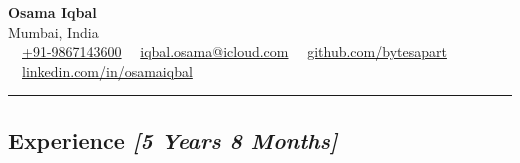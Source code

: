 \documentclass[11pt,a4paper]{article}
\begin{document}
\begin{center}
        {\LARGE \textbf{Osama Iqbal}}\\
        Mumbai, India
        \vspace{0.05cm}
        \\
        \raisebox{-0.2\height} {\Large \faPhoneSquare} \ \ \href{tel:+919867143600}{+91-9867143600} \hfill\raisebox{-0.2\height}{\Large \faEnvelopeSquare} \ \ \href{mailto:iqbal.osama@icloud.com}{iqbal.osama@icloud.com} \hfill \raisebox{-0.2\height}{\Large \faGithubSquare} \ \ \href{https://github.com/bytesapart}{github.com/bytesapart} \hfill \raisebox{-0.2\height}{\Large \faLinkedinSquare} \ \ \href{https://linkedin.com/in/osamaiqbal}{linkedin.com/in/osamaiqbal}
\end{center}


\hrule
\vspace{-1em}
\subsection*{\Large Experience \emph{[5 Years 8 Months]}}
\end{document}

